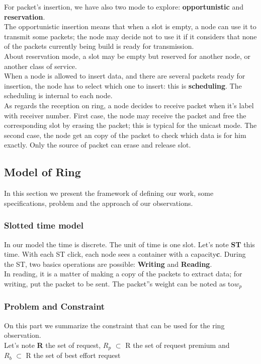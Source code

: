 \documentclass{article}
\begin{document}
For packet's insertion, we have also two mode to explore: \textbf{opportunistic} and \textbf{reservation}.\\ 
The opportunistic insertion means that when a slot is empty, a node can use it to transmit some packets; the node may decide not to use it if it considers that none of the packets currently being build is ready for transmission.\\
About reservation mode, a slot may be empty but reserved for another node, or another class of service.\\
When a node is allowed to insert data, and there are several packets ready for insertion, the node has to select which one to insert: this is \textbf{scheduling}. The scheduling is internal to each node.\\

As regards the reception  on ring, a node decides to receive packet when it's label with receiver number. First case, the node may receive the packet and free the corresponding slot by erasing the packet; this is typical for the unicast mode. The second case, the node get an copy of the packet to check which data is for him exactly. Only the source of packet can erase and release slot.\\


\subsection{Model of Ring}
In this section we present the framework of defining our work, some specifications, problem and the approach of our observations.
\subsubsection{Slotted time model}
In our model the time is discrete. The unit of time is one slot. Let's note \textbf{ST} this time. With each ST click, each node sees a container with a capacity\textbf{c}. During the ST, two basics operations are possible:  \textbf{Writing} and  \textbf{Reading}.\\
In reading, it is a matter of making a copy of the packets to extract  data; for writing, put the packet to be sent. The packet''s weight can be noted  as to{$w_{p}$}


\subsubsection{Problem and Constraint}
On this part we summarize the constraint that can be used for the ring observation.\\
Let's note \textbf{R} the set of request, \textbf{$R_{p}$} $\subset$ R the set of request premium and  \\ \textbf{$R_{b}$} $\subset$ R the set of best effort request\\
\end{document}
